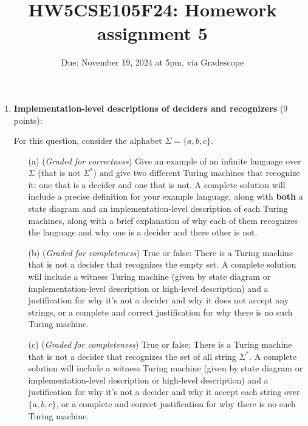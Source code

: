 \documentclass[12pt, oneside]{article}
\newcommand{\gradeCorrect}{({\it Graded for correctness}) }
\newcommand{\gradeComplete}{({\it Graded for completeness}) }
\begin{document}
\begin{enumerate}[wide, labelwidth=!, labelindent=0pt]
\begin{enumerate}
\end{enumerate}



\item\textbf{Implementation-level descriptions of deciders and recognizers} (9 points):

For this question, consider the alphabet $\Sigma = \{a,b,c\}$.
\begin{enumerate}
\item[(a)]\gradeCorrect Give an example of an infinite language over $\Sigma$ (that is not $\Sigma^*$) and give
two different Turing machines that recognize it: one that is a decider and one that is not.
A complete solution will include a precise definition for your example language, 
along with {\bf both} a state diagram and an implementation-level description 
of each Turing machines, along with a brief explanation of why each of them recognizes
the language and why one is a decider and there other is not.

\item[(b)]\gradeComplete True or false: There is a Turing machine that is not a decider that recognizes 
the empty set. A complete solution will include a witness Turing machine (given by 
state diagram or implementation-level description or high-level description) and a justification 
for why it's not a decider and why it does not accept any strings, or a complete and correct
justification for why there is no such Turing machine.

\item[(c)]\gradeComplete True or false: There is a Turing machine that is not a decider that recognizes 
the set of all string $\Sigma^*$.  A complete solution will include a witness Turing machine 
(given by 
state diagram or implementation-level description or high-level description) and a justification 
for why it's not a decider and why it accept each string over $\{a,b,c\}$, or a complete and correct
justification for why there is no such Turing machine.
\end{enumerate}
\end{enumerate}
\newpage

\title{HW5CSE105F24: Homework assignment 5}
\date{Due: November 19, 2024 at 5pm, via Gradescope}



\maketitle
\thispagestyle{fancy}
\end{document}
